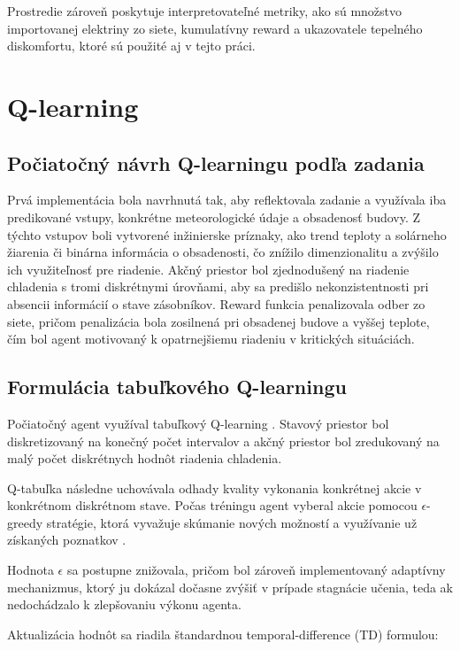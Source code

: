\documentclass[conference]{IEEEtran}
\begin{document}
Prostredie zároveň poskytuje interpretovateľné metriky, ako sú množstvo importovanej elektriny zo siete, kumulatívny reward a ukazovatele tepelného diskomfortu, ktoré sú použité aj v tejto práci.

\section{Q-learning}

\subsection{Počiatočný návrh Q-learningu podľa zadania}

Prvá implementácia bola navrhnutá tak, aby reflektovala zadanie a využívala iba predikované vstupy, konkrétne meteorologické údaje a obsadenosť budovy. Z týchto vstupov boli vytvorené inžinierske príznaky, ako trend teploty a solárneho žiarenia či binárna informácia o obsadenosti, čo znížilo dimenzionalitu a zvýšilo ich využiteľnosť pre riadenie. Akčný priestor bol zjednodušený na riadenie chladenia s tromi diskrétnymi úrovňami, aby sa predišlo nekonzistentnosti pri absencii informácií o stave zásobníkov. Reward funkcia penalizovala odber zo siete, pričom penalizácia bola zosilnená pri obsadenej budove a vyššej teplote, čím bol agent motivovaný k opatrnejšiemu riadeniu v kritických situáciách.


\subsection{Formulácia tabuľkového Q-learningu}

Počiatočný agent využíval tabuľkový Q-learning \cite{b12,b13}. Stavový priestor bol diskretizovaný na konečný počet intervalov a akčný priestor bol zredukovaný na malý počet diskrétnych hodnôt riadenia chladenia.

Q-tabuľka následne uchovávala odhady kvality vykonania konkrétnej akcie v konkrétnom diskrétnom stave. Počas tréningu agent vyberal akcie pomocou $\epsilon$-greedy stratégie, ktorá vyvažuje skúmanie nových možností a využívanie už získaných poznatkov \cite{b13}.

Hodnota $\epsilon$ sa postupne znižovala, pričom bol zároveň implementovaný adaptívny mechanizmus, ktorý ju dokázal dočasne zvýšiť v prípade stagnácie učenia, teda ak nedochádzalo k zlepšovaniu výkonu agenta.

Aktualizácia hodnôt sa riadila štandardnou temporal-difference (TD) formulou:
\end{document}
